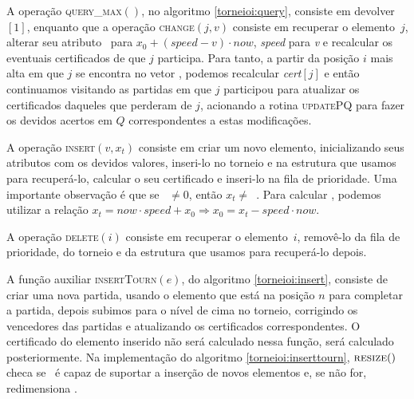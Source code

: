 A operação \textsc{query\_max}$()$, no algoritmo
\ref{torneioi:query}, consiste em devolver \torneio$[1]$, enquanto
que a operação \textsc{change}$(j, v)$ consiste em recuperar o
elemento~$j$, alterar seu atributo \initv~para
$x_0+(\mathit{speed}-v)\cdot now$, \textit{speed} para \textit{v} e
recalcular os eventuais certificados de que $j$ participa. Para
tanto, a partir da posição $i$ mais alta em que $j$ se encontra no
vetor \torneio, podemos recalcular \textit{cert}$[j]$ e então
continuamos visitando as partidas em que $j$ participou para
atualizar os certificados daqueles que perderam de $j$, acionando a
rotina \textsc{updatePQ} para fazer os devidos acertos em $Q$
correspondentes a estas modificações.





A operação \textsc{insert}$(v, x_t)$ consiste em criar um novo elemento,
inicializando seus atributos com os devidos valores,
inseri-lo no torneio e na estrutura que usamos para recuperá-lo,
calcular o seu certificado e inseri-lo na fila de prioridade.
Uma importante observação é que se \now~$\neq 0$, então $x_t
\neq$~\initv. Para calcular \initv, podemos utilizar a relação
$x_t = now\cdot speed + x_0 \Rightarrow x_0 = x_t - speed\cdot
now$.



A operação \textsc{delete}$(i)$ consiste em recuperar o
elemento~$i$, removê-lo da fila de prioridade, do torneio e da
estrutura que usamos para recuperá-lo depois.



A função auxiliar \textsc{insertTourn}$(e)$, do algoritmo
\ref{torneioi:insert}, consiste de criar uma nova partida, usando o
elemento que está na posição $n$ para completar a partida, depois
subimos para o nível de cima no torneio, corrigindo os vencedores
das partidas e atualizando os certificados correspondentes. O
certificado do elemento inserido não será calculado nessa função,
será calculado posteriormente. Na implementação do algoritmo
\ref{torneioi:inserttourn}, $\textsc{resize}()$ checa se \torneio~é
capaz de suportar a inserção de novos elementos e, se não for,
redimensiona \torneio.





